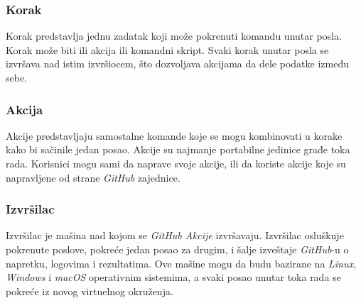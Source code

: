 \subsubsection{Korak}
Korak predstavlja jednu zadatak koji može pokrenuti komandu unutar posla. Korak može biti ili akcija ili 
komandni skript. Svaki korak unutar posla se izvršava nad istim izvršiocem, što dozvoljava akcijama da 
dele podatke između sebe.

\subsubsection{Akcija}
Akcije predstavljaju samostalne komande koje se mogu kombinovati u korake kako bi sačinile jedan posao.
Akcije su najmanje portabilne jedinice građe toka rada. Korisnici mogu sami da naprave svoje akcije,
ili da koriste akcije koje su napravljene od strane \textit{GitHub} zajednice. 

\subsubsection{Izvršilac}
Izvršilac je mašina nad kojom se \textit{GitHub Akcije} izvršavaju. Izvršilac osluškuje pokrenute poslove,
pokreće jedan posao za drugim, i šalje izveštaje \textit{GitHub}-u o napretku, logovima i rezultatima. Ove 
mašine mogu da budu bazirane na \textit{Linux}, \textit{Windows} i \textit{macOS} operativnim sistemima, a svaki posao 
unutar toka rada se pokreće iz novog virtuelnog okruženja.~\cite{GitHubActions}

